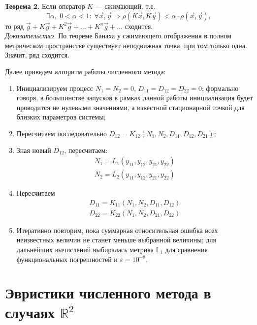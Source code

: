 \textbf{Теорема 2.} Если оператор $K$ --- сжимающий, т.е.
\begin{equation*}
	\exists \alpha,\;0<\alpha<1:\;\forall \vec{x}, \vec{y} \Rightarrow \rho(K\vec{x}, K\vec{y})<\alpha\cdot\rho(\vec{x}, \vec{y}),
\end{equation*}
	то ряд  $\vec{g}+K\vec{g}+K^2\vec{g}+\ldots+K^n\vec{g}+\ldots$ сходится.\\
\textit{Доказательство.} По теореме Банаха у сжимающего отображения в полном метрическом пространстве существует неподвижная точка, при том только одна. Значит, ряд сходится.

Далее приведем алгоритм работы численного метода:

\begin{enumerate}
	\item Инициализируем процесс $N_1=N_2=0$, $D_{11}=D_{12}=D_{22}=0$; формально говоря, в большинстве запусков в рамках данной работы инициализация будет проводится не нулевыми значениями, а известной стационарной точкой для близких параметров системы;
	\item Пересчитаем последовательно $D_{12}=K_{12}(N_1, N_2, D_{11}, D_{12}, D_{21})$;
	\item Зная новый $D_{12}$, пересчитаем:
	\begin{align*}
	N_1=L_1(y_{11}, y_{12}, y_{21}, y_{22}) \\
	N_2=L_2(y_{11}, y_{12}, y_{21}, y_{22})
	\end{align*}
	\item Пересчитаем
	\begin{align*}
	D_{11}=K_{11}(N_{1},N_{2},D_{11},D_{12})\\
	D_{22}=K_{22}(N_{1},N_{2},D_{21},D_{22})
	\end{align*}
	\item Итеративно повторим, пока суммарная относительная ошибка всех неизвестных величин не станет меньше выбранной величины; для дальнейших вычислений выбиралась метрика $\mathbb{L}_1$ для сравнения функциональных погрешностей и $\varepsilon=10^{-8}$.
\end{enumerate}

\section{Эвристики численного метода в случаях $ \mathbb{R}^2 $}

